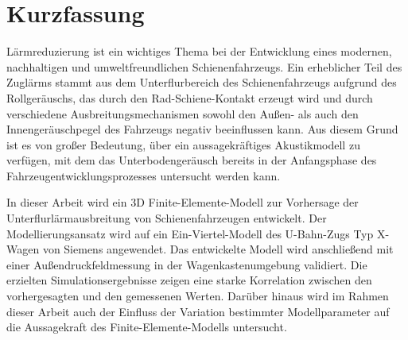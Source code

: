 \section*{Kurzfassung}

Lärmreduzierung ist ein wichtiges Thema bei der Entwicklung eines modernen, nachhaltigen und umweltfreundlichen Schienenfahrzeugs. Ein erheblicher Teil des Zuglärms stammt aus dem Unterflurbereich des Schienenfahrzeugs aufgrund des Rollgeräuschs, das durch den Rad-Schiene-Kontakt erzeugt wird und durch verschiedene Ausbreitungsmechanismen sowohl den Außen- als auch den Innengeräuschpegel des Fahrzeugs negativ beeinflussen kann. Aus diesem Grund ist es von großer Bedeutung, über ein aussagekräftiges Akustikmodell zu verfügen, mit dem das Unterbodengeräusch bereits in der Anfangsphase des Fahrzeugentwicklungsprozesses untersucht werden kann.

In dieser Arbeit wird ein 3D Finite-Elemente-Modell zur Vorhersage der Unterflurlärmausbreitung von Schienenfahrzeugen entwickelt. Der Modellierungsansatz wird auf ein Ein-Viertel-Modell des U-Bahn-Zugs Typ X-Wagen von Siemens angewendet. Das entwickelte Modell wird anschließend mit einer Außendruckfeldmessung in der Wagenkastenumgebung validiert. Die erzielten Simulationsergebnisse zeigen eine starke Korrelation zwischen den vorhergesagten und den gemessenen Werten. Darüber hinaus wird im Rahmen dieser Arbeit auch der Einfluss der Variation bestimmter Modellparameter auf die Aussagekraft des Finite-Elemente-Modells untersucht.